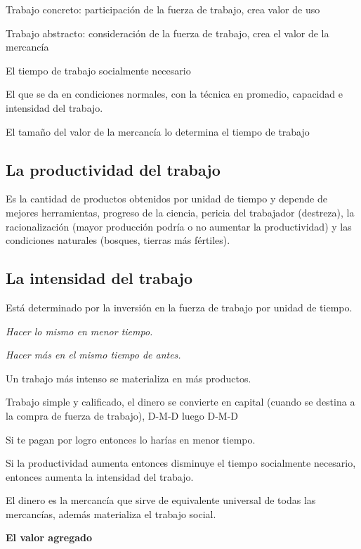 \documentclass[
  a4paper,
]{article}
\begin{document}
Trabajo concreto: participación de la fuerza de trabajo, crea valor de
uso

Trabajo abstracto: consideración de la fuerza de trabajo, crea el valor
de la mercancía

El tiempo de trabajo socialmente necesario

El que se da en condiciones normales, con la técnica en promedio,
capacidad e intensidad del trabajo.

El tamaño del valor de la mercancía lo determina el tiempo de trabajo

\hypertarget{la-productividad-del-trabajo}{%
\subsection{La productividad del
trabajo}\label{la-productividad-del-trabajo}}

Es la cantidad de productos obtenidos por unidad de tiempo y depende de
mejores herramientas, progreso de la ciencia, pericia del trabajador
(destreza), la racionalización (mayor producción podría o no aumentar la
productividad) y las condiciones naturales (bosques, tierras más
fértiles).

\hypertarget{la-intensidad-del-trabajo}{%
\subsection{La intensidad del trabajo}\label{la-intensidad-del-trabajo}}

Está determinado por la inversión en la fuerza de trabajo por unidad de
tiempo.

\emph{Hacer lo mismo en menor tiempo.}

\emph{Hacer más en el mismo tiempo de antes.}

Un trabajo más intenso se materializa en más productos.

Trabajo simple y calificado, el dinero se convierte en capital (cuando
se destina a la compra de fuerza de trabajo), D-M-D luego D-M-D

Si te pagan por logro entonces lo harías en menor tiempo.

Si la productividad aumenta entonces disminuye el tiempo socialmente
necesario, entonces aumenta la intensidad del trabajo.

El dinero es la mercancía que sirve de equivalente universal de todas
las mercancías, además materializa el trabajo social.

\textbf{El valor agregado}
\end{document}
